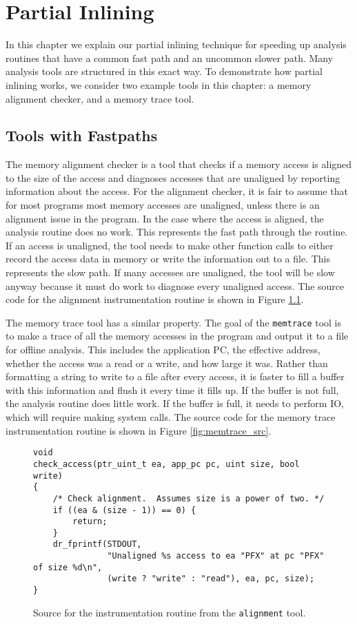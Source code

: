 \chapter{Partial Inlining}
\label{sec:partial_inlining}

In this chapter we explain our partial inlining technique for speeding up
analysis routines that have a common fast path and an uncommon slower path.
Many analysis tools are structured in this exact way.  To demonstrate how
partial inlining works, we consider two example tools in this chapter: a memory
alignment checker, and a memory trace tool.

\section{Tools with Fastpaths}

The memory alignment checker is a tool that checks if a memory access is aligned
to the size of the access and diagnoses accesses that are unaligned by reporting
information about the access.  For the alignment checker, it is fair to assume
that for most programs most memory accesses are unaligned, unless there is an
alignment issue in the program.  In the case where the access is aligned, the
analysis routine does no work.  This represents the fast path through the
routine.  If an access is unaligned, the tool needs to make other function calls
to either record the access data in memory or write the information out to a
file.  This represents the slow path.  If many accesses are unaligned, the tool
will be slow anyway because it must do work to diagnose every unaligned access.
The source code for the alignment instrumentation routine is shown in Figure
\ref{fig:alignment_src}.

The memory trace tool has a similar property.  The goal of the {\tt memtrace}
tool is to make a trace of all the memory accesses in the program and output it
to a file for offline analysis.  This includes the application PC, the effective
address, whether the access was a read or a write, and how large it was.  Rather
than formatting a string to write to a file after every access, it is faster to
fill a buffer with this information and flush it every time it fills up.  If the
buffer is not full, the analysis routine does little work.  If the buffer is
full, it needs to perform IO, which will require making system calls.  The
source code for the memory trace instrumentation routine is shown in Figure
\ref{fig:memtrace_src}.

\begin{figure}
\begin{verbatim}
void
check_access(ptr_uint_t ea, app_pc pc, uint size, bool write)
{
    /* Check alignment.  Assumes size is a power of two. */
    if ((ea & (size - 1)) == 0) {
        return;
    }
    dr_fprintf(STDOUT,
               "Unaligned %s access to ea "PFX" at pc "PFX" of size %d\n",
               (write ? "write" : "read"), ea, pc, size);
}
\end{verbatim}
\caption{Source for the instrumentation routine from the {\tt alignment} tool.}
\label{fig:alignment_src}
\end{figure}

